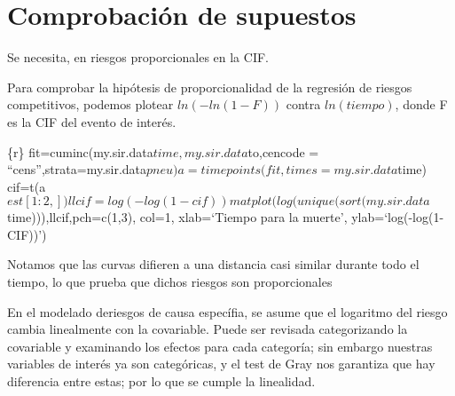 \documentclass[
]{article}
\begin{document}
\hypertarget{comprobaciuxf3n-de-supuestos}{%
\section{Comprobación de supuestos}\label{comprobaciuxf3n-de-supuestos}}

Se necesita, en riesgos proporcionales en la CIF.

Para comprobar la hipótesis de proporcionalidad de la regresión de
riesgos competitivos, podemos plotear \(ln(-ln(1-F))\) contra
\(ln(tiempo)\), donde F es la CIF del evento de interés.

\{r\} fit=cuminc(my.sir.data\(time,my.sir.data\)to,cencode =
``cens'',strata=my.sir.data\(pneu) a=timepoints(fit,times=my.sir.data\)time)
cif=t(a\(est[1:2,]) llcif=log(-log(1-cif)) matplot(log(unique(sort(my.sir.data\)time))),llcif,pch=c(1,3),
col=1, xlab=`Tiempo para la muerte', ylab=`log(-log(1-CIF))')

Notamos que las curvas difieren a una distancia casi similar durante
todo el tiempo, lo que prueba que dichos riesgos son proporcionales

En el modelado deriesgos de causa específia, se asume que el logaritmo
del riesgo cambia linealmente con la covariable. Puede ser revisada
categorizando la covariable y examinando los efectos para cada
categoría; sin embargo nuestras variables de interés ya son categóricas,
y el test de Gray nos garantiza que hay diferencia entre estas; por lo
que se cumple la linealidad.
\end{document}
